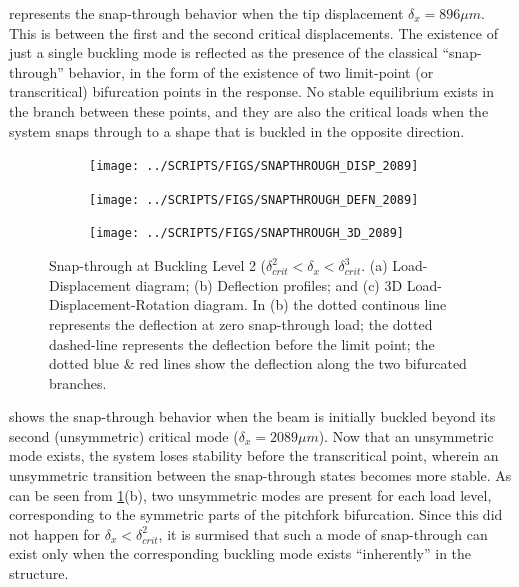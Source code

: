 \documentclass[10pt]{article}
\begin{document}
 represents the snap-through behavior when the tip
displacement $\delta_x=896\mu m$. This is between the first and the
second critical displacements. The existence of just a single buckling
mode is reflected as the presence of the classical ``snap-through''
behavior, in the form of the existence of two limit-point (or
transcritical) bifurcation points in the response. No stable
equilibrium exists in the branch between these points, and they are
also the critical loads when the system snaps through to a shape that
is buckled in the opposite direction.

\begin{figure}[!h]
  \centering
  \begin{subfigure}[!t]{0.33\linewidth}
    \centering    
    \texttt{[image: ../SCRIPTS/FIGS/SNAPTHROUGH\_DISP\_2089]}
    \caption{}
  \end{subfigure}%
  \begin{subfigure}[!t]{0.33\linewidth}
    \centering    
    \texttt{[image: ../SCRIPTS/FIGS/SNAPTHROUGH\_DEFN\_2089]}
    \caption{}
  \end{subfigure}%
  \begin{subfigure}[!t]{0.33\linewidth}
    \centering
    \texttt{[image: ../SCRIPTS/FIGS/SNAPTHROUGH\_3D\_2089]}
    \caption{}
  \end{subfigure}
  \caption{Snap-through at Buckling Level 2 ($\delta_{crit}^2 <
    \delta_x < \delta_{crit}^3$. (a) Load-Displacement diagram; (b)
    Deflection profiles; and (c) 3D Load-Displacement-Rotation
    diagram. In (b) the dotted continous line represents
    the deflection at zero snap-through load; the dotted dashed-line
    represents the deflection before the limit point; the dotted blue \&
    red lines show the deflection along the two bifurcated branches.} 
  \label{fig:buck2}
\end{figure}

 shows the snap-through behavior when the beam is
initially buckled beyond its second (unsymmetric) critical mode
($\delta_x=2089\mu m$). Now that an unsymmetric mode exists, the
system loses stability before the transcritical point, wherein an
unsymmetric transition between the snap-through states becomes more
stable. As can be seen from \cref{fig:buck2}(b), two unsymmetric modes
are present for each load level, corresponding to the symmetric parts
of the pitchfork bifurcation. Since this did not happen for $\delta_x
< \delta_{crit}^2$, it is surmised that such a mode of snap-through
can exist only when the corresponding buckling mode exists
``inherently'' in the structure.
\end{document}
